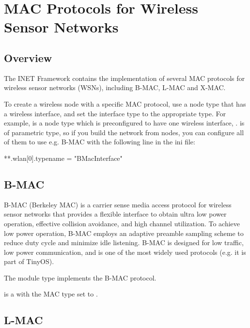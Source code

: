 \chapter{MAC Protocols for Wireless Sensor Networks}
\label{cha:sensor-macs}

\section{Overview}

The INET Framework contains the implementation of several MAC protocols
for wireless sensor networks (WSNs), including B-MAC, L-MAC and X-MAC.

To create a wireless node with a specific MAC protocol, use a node type 
that has a wireless interface, and set the interface type to the 
appropriate type. For example,  is a node type 
which is preconfigured to have one wireless interface, .
 is of parametric type, so if you build the network from
 nodes, you can configure all of them to use
e.g. B-MAC with the following line in the ini file:

\begin{inifile}
**.wlan[0].typename = "BMacInterface"
\end{inifile}


\section{B-MAC}
\label{sec:bmac}

B-MAC (Berkeley MAC) is a carrier sense media access protocol for 
wireless sensor networks that provides a flexible interface to obtain
ultra low power operation, effective collision avoidance, and 
high channel utilization. To achieve low power operation, 
B-MAC employs an adaptive preamble sampling scheme to reduce duty cycle 
and minimize idle listening. B-MAC is designed for low traffic, 
low power communication, and is one of the most widely used 
protocols (e.g. it is part of TinyOS).

The  module type implements the B-MAC protocol.

 is a  with the MAC type
set to .


\section{L-MAC}
\label{sec:lmac}

